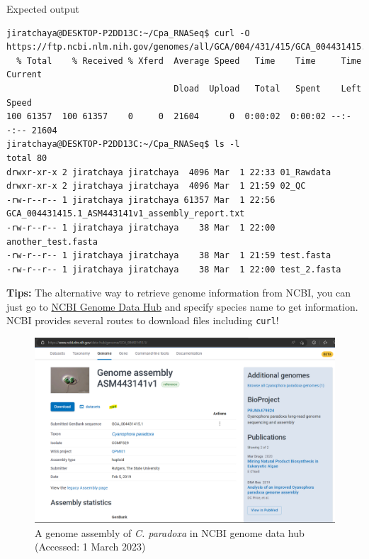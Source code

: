 \documentclass[
  letterpaper,
  DIV=11,
  numbers=noendperiod]{scrreprt}
\begin{document}
Expected output

\begin{verbatim}
jiratchaya@DESKTOP-P2DD13C:~/Cpa_RNASeq$ curl -O https://ftp.ncbi.nlm.nih.gov/genomes/all/GCA/004/431/415/GCA_004431415.1_ASM443141v1/GCA_004431415.1_ASM443141v1_assembly_report.txt
  % Total    % Received % Xferd  Average Speed   Time    Time     Time  Current
                                 Dload  Upload   Total   Spent    Left  Speed
100 61357  100 61357    0     0  21604      0  0:00:02  0:00:02 --:--:-- 21604
jiratchaya@DESKTOP-P2DD13C:~/Cpa_RNASeq$ ls -l
total 80
drwxr-xr-x 2 jiratchaya jiratchaya  4096 Mar  1 22:33 01_Rawdata
drwxr-xr-x 2 jiratchaya jiratchaya  4096 Mar  1 21:59 02_QC
-rw-r--r-- 1 jiratchaya jiratchaya 61357 Mar  1 22:56 GCA_004431415.1_ASM443141v1_assembly_report.txt
-rw-r--r-- 1 jiratchaya jiratchaya    38 Mar  1 22:00 another_test.fasta
-rw-r--r-- 1 jiratchaya jiratchaya    38 Mar  1 21:59 test.fasta
-rw-r--r-- 1 jiratchaya jiratchaya    38 Mar  1 22:00 test_2.fasta
\end{verbatim}

\textbf{Tips:} The alternative way to retrieve genome information from
NCBI, you can just go to
\href{https://www.ncbi.nlm.nih.gov/data-hub/genome/}{NCBI Genome Data
Hub} and specify species name to get information. NCBI provides several
routes to download files including \texttt{curl}!

\begin{figure}

{\centering \includegraphics{./assets/05_genome_data_hub.png}

}

\caption{A genome assembly of \emph{C. paradoxa} in NCBI genome data hub
(Accessed: 1 March 2023)}

\end{figure}
\end{document}
